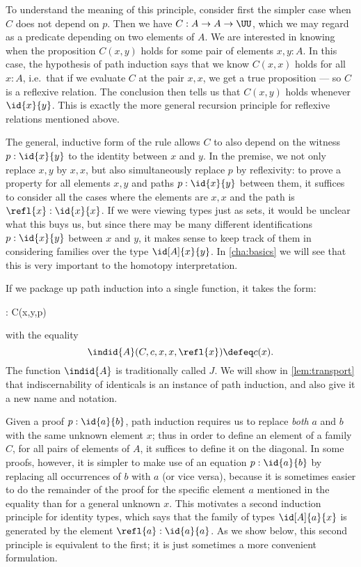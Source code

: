 To understand the meaning of this principle, consider first the simpler case when $C$
does not depend on $p$.  Then we have $C:A\to A\to \UU$, which we may
regard as a predicate depending on two elements of $A$.  We are
interested in knowing when the proposition $C(x,y)$ holds for some pair
of elements $x,y:A$.  In this case, the hypothesis of path induction
says that we know $C(x,x)$ holds for all $x:A$, i.e.\ that if we
evaluate $C$ at the pair $x, x$, we get a true proposition --- so $C$ is
a reflexive relation.  The conclusion then tells us that $C(x,y)$ holds
whenever $\id{x}{y}$.  This is exactly the more general recursion principle
for reflexive relations mentioned above.

The general, inductive form of the rule allows $C$ to also depend on the witness $p:\id{x}{y}$ to the identity between $x$ and $y$.  In the premise, we not only replace $x, y$ by $x,x$, but also simultaneously replace $p$ by reflexivity: to prove a property for all elements $x,y$ and paths $p : \id{x}{y}$ between them, it suffices to consider all the cases where the elements are $x,x$ and the path is $\refl{x}: \id{x}{x}$.  If we were viewing types just as sets, it would be unclear what this buys us, but since there may be many different identifications $p : \id{x}{y}$ between $x$ and $y$, it makes sense to keep track of them in considering families over the type $\id[A]{x}{y}$.
In \cref{cha:basics} we will see that this is very important to the homotopy interpretation.

If we package up path induction into a single function, it takes the form:
%
\begin{narrowmultline*}
   :  
   \to 
  \narrowbreak
     C(x,y,p)
\end{narrowmultline*}
with the equality
\[ \indid{A}(C,c,x,x,\refl{x}) \defeq c(x). \]
The function $ \indid{A}$ is traditionally called $J$.
%
We will show in \cref{lem:transport} that indiscernability of identicals is an instance of path induction, and also give it a new name and notation.

\mentalpause

Given a proof $p : \id{a}{b}$,
path induction requires us to replace \emph{both} $a$ and $b$ with the same unknown element $x$; thus in order to define an element of a family
$C$, for all pairs of elements of $A$, it suffices to define it on the diagonal.
In some proofs, however, it is simpler to make use of an equation $p : \id{a}{b}$ by replacing all occurrences of $b$ with $a$ (or vice versa), because it is sometimes easier to do the remainder of the proof for the specific element $a$ mentioned in the equality than for a general unknown $x$.  This motivates a second induction principle for identity types, which says that the family of types $\id[A]{a}{x}$ is generated by the element $\refl{a} : \id{a}{a}$.  As we show below, this second principle is equivalent to the first; it is just sometimes a more convenient formulation.


